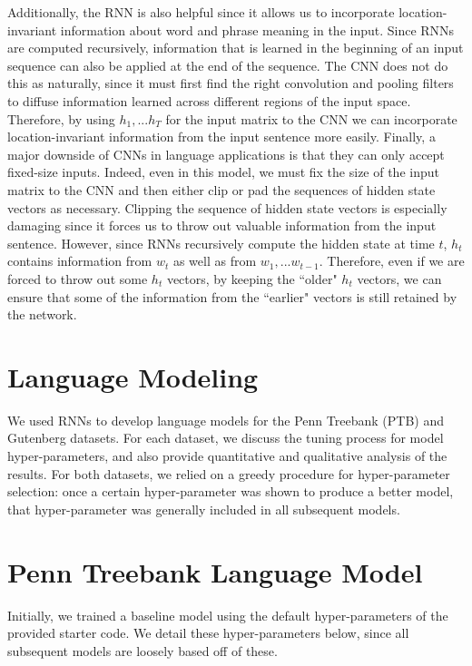 \documentclass[a4paper]{article}
\begin{document}
\newline
\newline
Additionally, the RNN is also helpful since it allows us to incorporate location-invariant information about word and phrase meaning in the input. Since RNNs are computed recursively, information that is learned in the beginning of an input sequence can also be applied at the end of the sequence. The CNN does not do this as naturally, since it must first find the right convolution and pooling filters to diffuse information learned across different regions of the input space. Therefore, by using $h_1,...h_T$ for the input matrix to the CNN we can incorporate location-invariant information from the input sentence more easily.
\newline
\newline
Finally, a major downside of CNNs in language applications is that they can only accept fixed-size inputs. Indeed, even in this model, we must fix the size of the input matrix to the CNN and then either clip or pad the sequences of hidden state vectors as necessary. Clipping the sequence of hidden state vectors is especially damaging since it forces us to throw out valuable information from the input sentence. However, since RNNs recursively compute the hidden state at time $t$, $h_t$ contains information from $w_t$ as well as from $w_1, ... w_{t-1}$. Therefore, even if we are forced to throw out some $h_t$ vectors, by keeping the ``older" $h_t$ vectors, we can ensure that some of the information from the ``earlier" vectors is still retained by the network. 
\newline
\newline

\section{Language Modeling}

We used RNNs to develop language models for the Penn Treebank (PTB) and Gutenberg datasets. For each dataset, we discuss the tuning process for model hyper-parameters, and also provide quantitative and qualitative analysis of the results. For both datasets, we relied on a greedy procedure for hyper-parameter selection: once a certain hyper-parameter was shown to produce a better model, that hyper-parameter was generally included in all subsequent models. 

\section{Penn Treebank Language Model}
Initially, we trained a baseline model using the default hyper-parameters of the provided starter code. We detail these hyper-parameters below, since all subsequent models are loosely based off of these. 
\end{document}
